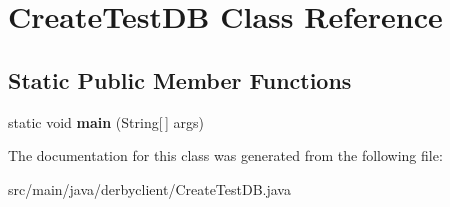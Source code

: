 \hypertarget{classCreateTestDB}{}\section{Create\+Test\+DB Class Reference}
\label{classCreateTestDB}
\subsection*{Static Public Member Functions}
\begin{DoxyCompactItemize}
\item 
\mbox{\label{classCreateTestDB_a21060101bcdfad77662e242615a881bf}} 
static void {\bfseries main} (String\mbox{[}$\,$\mbox{]} args)
\end{DoxyCompactItemize}


The documentation for this class was generated from the following file\+:\begin{DoxyCompactItemize}
\item 
src/main/java/derbyclient/Create\+Test\+D\+B.\+java\end{DoxyCompactItemize}
